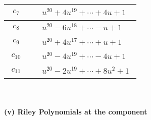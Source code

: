 \documentclass[1p]{elsarticle_modified}
\theoremstyle{definition}
\begin{document}
\begin{tabular}{m{50pt}|m{274pt}}
\hline $$\begin{aligned}c_{7}\end{aligned}$$&$\begin{aligned}
&u^{20}+4 u^{19}+\cdots+4 u+1
\end{aligned}$\\
\hline $$\begin{aligned}c_{8}\end{aligned}$$&$\begin{aligned}
&u^{20}-6 u^{18}+\cdots- u+1
\end{aligned}$\\
\hline $$\begin{aligned}c_{9}\end{aligned}$$&$\begin{aligned}
&u^{20}+4 u^{17}+\cdots+u+1
\end{aligned}$\\
\hline $$\begin{aligned}c_{10}\end{aligned}$$&$\begin{aligned}
&u^{20}-4 u^{19}+\cdots-4 u+1
\end{aligned}$\\
\hline $$\begin{aligned}c_{11}\end{aligned}$$&$\begin{aligned}
&u^{20}-2 u^{19}+\cdots+8 u^2+1
\end{aligned}$\\
\hline
\end{tabular}\\~\\
\newpage\renewcommand{\arraystretch}{1}
\flushleft \textbf{(v) Riley Polynomials at the component}\newline \\
\end{document}
